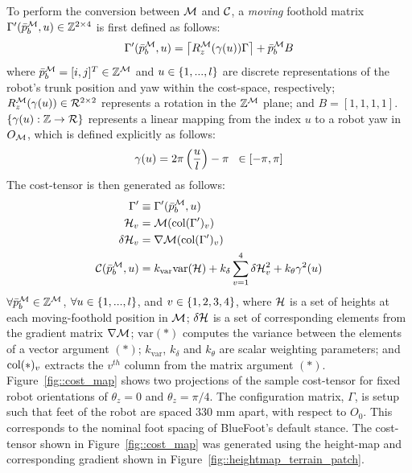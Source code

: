 			To perform the conversion between ${\cal M}$ and ${\cal C}$, a \emph{moving} foothold matrix $\Gamma'(\bar{p}^{{\cal M}}_{b},u) \in {\Bbb Z}^{2\times4}$ is first defined as follows:
				\begin{equation}
					\Gamma'(\bar{p}^{{\cal M}}_{b},u) = \left\lceil R_{z}^{{\cal M}}(\gamma(u))\Gamma \right\rceil + \bar{p}^{{\cal M}}_{b} B \\
					\label{eq::rel_feet}
				\end{equation}
			where  $\bar{p}^{{\cal M}}_{b} = [i,j]^T\in{\Bbb Z}^{{\cal M}}$ and $u \in \left\{1,...,l\right\}$ are discrete representations of the robot's trunk position and yaw within the cost-space, respectively; $R_{z}^{{\cal M}}(\gamma(u))\in{\cal R}^{2\times2}$ represents a rotation in the ${\Bbb Z}^{{\cal M}}$ plane; and $B = [1,1,1,1]$. $\left\{\gamma(u) : {\Bbb Z} \rightarrow {\cal R} \right\}$ represents a linear mapping from the index $u$ to a robot yaw in $O_{{\cal M}}$, which is defined explicitly as follows:
				\begin{equation} 
					\gamma(u) = 2\pi\left(\frac{u}{l}\right) - \pi \hspace{2mm} \in [-\pi,\pi]
					\label{eq::gamma}
				\end{equation}
			The cost-tensor is then generated as follows:
				\begin{equation}
					\begin{split}
						\Gamma'	 					&\equiv \Gamma'(\bar{p}^{{\cal M}}_{b},u)  \\
						{\cal H}_{v} 			&=		{\cal M}(\text{col}(\Gamma')_{v})	 \\
						\delta {\cal H}_{v} 	&= 		\nabla {\cal M}(\text{col}(\Gamma')_{v}) \\
						{\cal C}(\bar{p}^{{\cal M}}_{b},u) 	&= k_{\text{var}} \text{var}({\cal H}) + k_{\delta}\sum_{v=1}^{4} \delta {\cal H}_{v}^{2} + k_{\theta} \gamma^{2}(u) 
					\end{split}
				\end{equation}
			$\forall \bar{p}^{{\cal M}}_{b} \in \mathbb{Z}^{{\cal M}}$, $\forall u \in \left\{1,...,l\right\}$, and  $v \in \left\{1,2,3,4\right\}$, where ${\cal H}$ is a set of heights at each moving-foothold position in ${\cal M}$; $\delta{\cal H}$ is a set of corresponding elements from the gradient matrix $\nabla {\cal M}$; $\text{var}(*)$ computes the variance between the elements of a vector argument $(*)$; $k_{\text{var}}$, $k_{\delta}$ and $k_{\theta}$ are scalar weighting parameters; and $\text{col}(*)_{v}$ extracts the $v^{th}$ column from the matrix argument $(*)$. Figure~\ref{fig::cost_map} shows two projections of the sample cost-tensor for fixed robot orientations of $\theta_{z}=0$ and $\theta_{z}=\pi/4$. The configuration matrix, $\Gamma$, is setup such that feet of the robot are spaced $330\text{ mm}$ apart, with respect to $O_{0}$. This corresponds to the nominal foot spacing of BlueFoot's default stance. The cost-tensor shown in Figure~\ref{fig::cost_map} was generated using the height-map and corresponding gradient shown in Figure~\ref{fig::heightmap_terrain_patch}.

